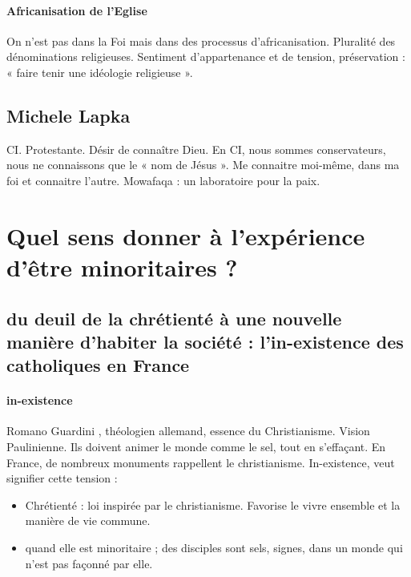 \paragraph{Africanisation de l’Eglise} On n’est pas dans la Foi mais dans des processus d’africanisation.  Pluralité des dénominations religieuses. Sentiment d’appartenance et de tension, préservation : « faire tenir une idéologie religieuse ». 				
\subsection{Michele Lapka} CI. Protestante. Désir de connaître Dieu. En CI, nous sommes conservateurs, nous ne connaissons que le « nom de Jésus ». Me connaitre moi-même, dans ma foi et connaitre l’autre. Mowafaqa : un laboratoire pour la paix. 

\section{ Quel sens donner à l’expérience d’être minoritaires ?}
 

\subsection{du deuil de la chrétienté à une nouvelle manière d’habiter la société : l’in-existence des catholiques en France}

\paragraph{in-existence} Romano Guardini , {théologien allemand}, essence du Christianisme. Vision Paulinienne. Ils doivent animer le monde comme le sel, tout en s’effaçant. 
En France, de nombreux monuments rappellent le christianisme. In-existence, veut signifier cette tension : 
\begin{itemize}
\item Chrétienté : loi inspirée par le christianisme. Favorise le vivre ensemble et la manière de vie commune.
\item quand elle est minoritaire ; des disciples sont sels, signes, dans un monde qui n’est pas façonné par elle.
\end{itemize}

